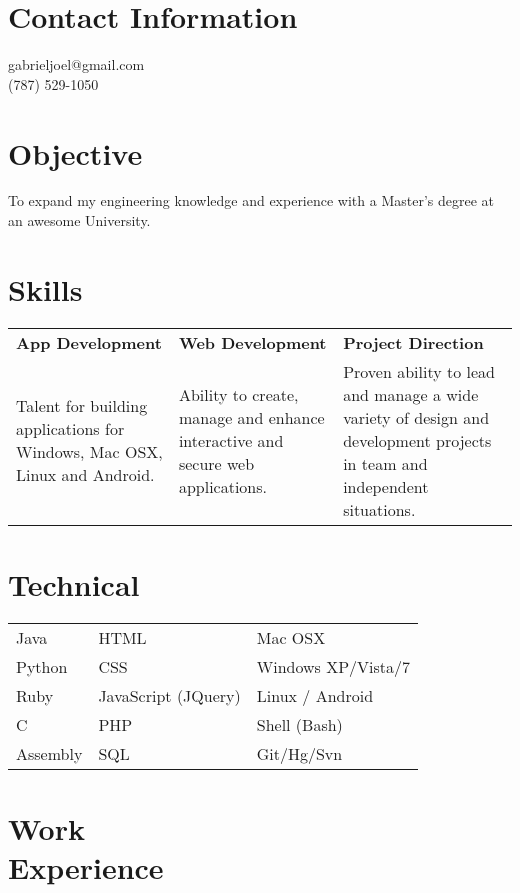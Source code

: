 \documentclass[margin,line]{res}
\begin{document}


\begin{resume}
\section{\sc Contact Information}
\vspace{.05in}
gabrieljoel@gmail.com \\
(787) 529-1050       



\section{\sc Objective}
To expand my engineering knowledge and experience with a Master's degree at an awesome University. 

\section{\sc Skills}
\begin{tabular}{@{}p{2in}p{2in}p{1.7in}}
{\bf App Development}             & {\bf Web Development}  & {\bf Project Direction} \\            
Talent for building applications for Windows, Mac OSX, Linux and Android.    & Ability to create, manage and enhance interactive and secure web applications. & Proven ability to lead and manage a wide variety of design and development projects in team and independent situations.   
\end{tabular}

\section{\sc Technical}
\begin{tabular}{@{}p{2in}p{2in}p{2in}}
 Java           & HTML  & Mac OSX  \\            
Python   & CSS & Windows XP/Vista/7   \\
Ruby & JavaScript (JQuery) & Linux / Android \\
C & PHP & Shell (Bash) \\
Assembly & SQL & Git/Hg/Svn 
\end{tabular}



\section{\sc Work \\Experience}


\end{resume}
\end{document}
